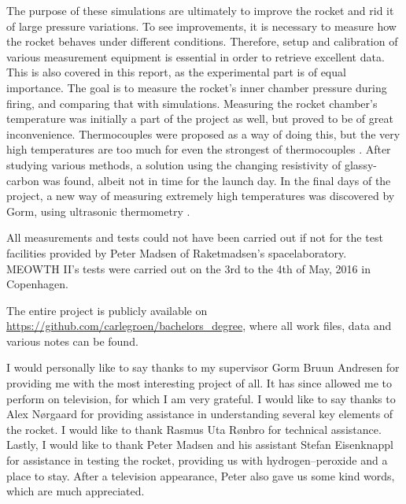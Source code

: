 The purpose of these simulations are ultimately to improve the rocket and rid it of large pressure variations. To see improvements, it is necessary to measure how the rocket behaves under different conditions. Therefore, setup and calibration of various measurement equipment is essential in order to retrieve excellent data. This is also covered in this report, as the experimental part is of equal importance. The goal is to measure the rocket's inner chamber pressure during firing, and comparing that with simulations. Measuring the rocket chamber's temperature was initially a part of the project as well, but proved to be of great inconvenience. Thermocouples were proposed as a way of doing this, but the very high temperatures are too much for even the strongest of thermocouples \cite{thermocoup}. After studying various methods, a solution using the changing resistivity of glassy-carbon was found, albeit not in time for the launch day. In the final days of the project, a new way of measuring extremely high temperatures was discovered by Gorm, using ultrasonic thermometry \cite{ultrasonic}.
 

All measurements and tests could not have been carried out if not for the test facilities provided by Peter Madsen of Raketmadsen's spacelaboratory. MEOWTH II's tests were carried out on the 3rd to the 4th of May, 2016 in Copenhagen.

The entire project is publicly available on \url{https://github.com/carlegroen/bachelors_degree}, where all work files, data and various notes can be found.

I would personally like to say thanks to my supervisor Gorm Bruun Andresen for providing me with the most interesting project of all. It has since allowed me to perform on television, for which I am very grateful. I would like to say thanks to Alex Nørgaard for providing assistance in understanding several key elements of the rocket. I would like to thank Rasmus Uta Rønbro for technical assistance. Lastly, I would like to thank Peter Madsen and his assistant Stefan Eisenknappl for assistance in testing the rocket, providing us with hydrogen--peroxide and a place to stay. After a television appearance, Peter also gave us some kind words, which are much appreciated.
